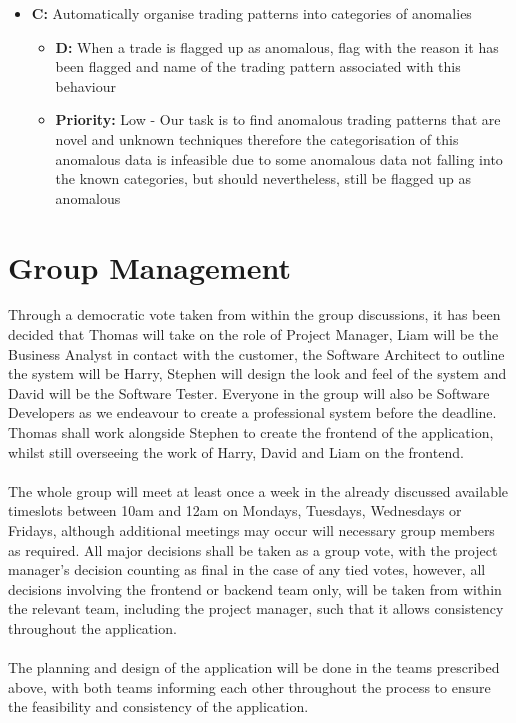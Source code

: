 \documentclass[11pt, oneside, a4paper]{article}
\begin{document}
\begin{itemize}
\begin{itemize}
	\end{itemize}
	\item \textbf{C:} Automatically organise trading patterns into categories of anomalies
	\begin{itemize}
		\item \textbf{D:} When a trade is flagged up as anomalous, flag with the reason it has been flagged and name of the trading pattern associated with this behaviour
		\item \textbf{Priority:} Low - Our task is to find anomalous trading patterns that are novel and unknown techniques therefore the categorisation of this anomalous data is infeasible due to some anomalous data not falling into the known categories, but should nevertheless, still be flagged up as anomalous
	\end{itemize}
\end{itemize}

\section{Group Management}
Through a democratic vote taken from within the group discussions, it has been decided that Thomas will take on the role of
Project Manager, Liam will be the Business Analyst in contact with the customer, the Software Architect to outline the system
will be Harry, Stephen will design the look and feel of the system and David will be the Software Tester. Everyone in the group
will also be Software Developers as we endeavour to create a professional system before the deadline. Thomas shall work alongside
Stephen to create the frontend of the application, whilst still overseeing the work of Harry, David and Liam on the frontend. \\\\
The whole group will meet at least once a week in the already discussed available timeslots between 10am and 12am on Mondays, Tuesdays,
Wednesdays or Fridays, although additional meetings may occur will necessary group members as required. All major decisions shall
be taken as a group vote, with the project manager's decision counting as final in the case of any tied votes, however, all decisions
involving the frontend or backend team only, will be taken from within the relevant team, including the project manager, such that it
allows consistency throughout the application.\\\\
The planning and design of the application will be done in the teams prescribed above, with both teams informing each other throughout
the process to ensure the feasibility and consistency of the application.
\end{document}
